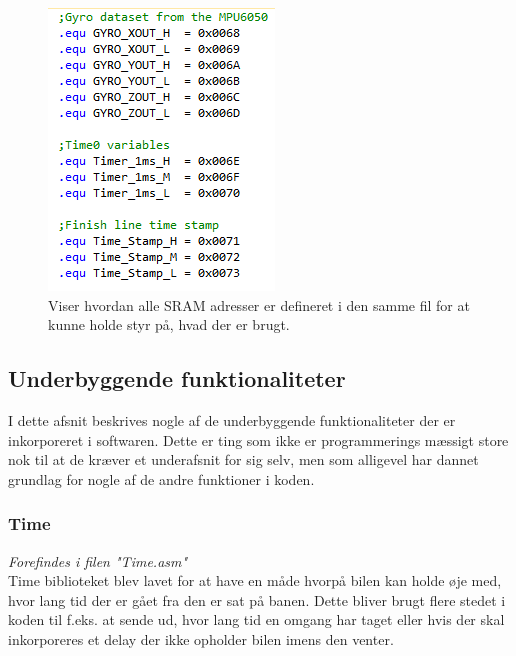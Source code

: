 \begin{figure}[h]
\begin{minipage}{.5\textwidth}
\begin{minipage}{.85\textwidth}
			\includegraphics[scale=0.1,width=\linewidth]{Billeder/SRAM_Example.PNG}
			\caption{Viser hvordan alle SRAM adresser er defineret i den samme fil for at kunne holde styr på, hvad der er 					brugt.}
			\label{fig:SRAMExample}
			\end{minipage}
	\end{minipage}
\end{figure}


\subsection{Underbyggende funktionaliteter}
I dette afsnit beskrives nogle af de underbyggende funktionaliteter der er inkorporeret i softwaren. Dette er ting som ikke er programmerings mæssigt store nok til at de kræver et underafsnit for sig selv, men som alligevel har dannet grundlag for nogle af de andre funktioner i koden.

\subsubsection{Time}
\textit{Forefindes i filen "Time.asm"}\\
Time biblioteket blev lavet for at have en måde hvorpå bilen kan holde øje med, hvor lang tid der er gået fra den er sat på banen. Dette bliver brugt flere stedet i koden til f.eks. at sende ud, hvor lang tid en omgang har taget eller hvis der skal inkorporeres et delay der ikke opholder bilen imens den venter. 

